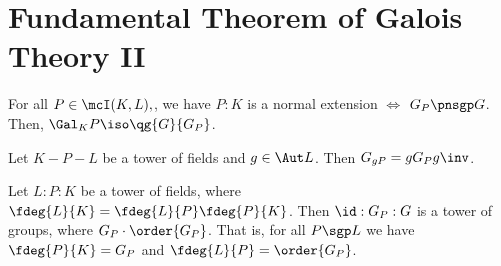 \documentclass[a4paper]{article}
\begin{document}
\section{Fundamental Theorem of Galois Theory II}
\begin{ttheorem}
  For all \( P\in \mcI(K,L), \), we have \( P:K \) is a normal extension \( \iff \) \( G_P\pnsgp G \).
  Then, \( \Gal_K P \iso \qg{G}{G_P} \).
\end{ttheorem}

\begin{tlemma}
  Let \( K-P-L \) be a tower of fields and \( g\in \Aut L \).
  Then \( G_{gP} = gG_Pg\inv \).
\end{tlemma}

\begin{tremark}
  Let \( L:P:K \) be a tower of fields, where \( \fdeg{L}{K} = \fdeg{L}{P}\fdeg{P}{K} \).
  Then \( \id:G_P:G \) is a tower of groups, where \( \index{G}{G_P}\cdot\order{G_P} \).
  That is, for all \( P\sgp L \) we have \( \fdeg{P}{K}=\index{G}{G_P} \) and \( \fdeg{L}{P} = \order{G_P} \).
\end{tremark}


\end{document}
